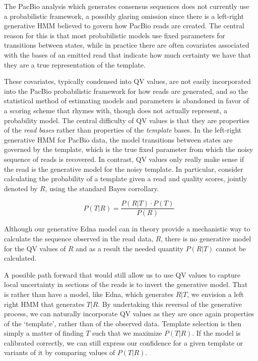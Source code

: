 \documentclass[fleqn,10pt]{SelfArx} %
\begin{document}
The PacBio analysis which generates consensus sequences does not currently use a probabilistic framework, a possibly glaring omission since there is a left-right generative HMM believed to govern how PacBio reads are created.  The central reason for this is that most probabilistic models use fixed parameters for transitions between states, while in practice there are often covariates associated with the bases of an emitted read that indicate how much certainty we have that they are a true representation of the template.

These covariates, typically condensed into QV values, are not easily incorporated into the PacBio probabilistic framework for how reads are generated, and so the statistical method of estimating models and parameters is abandoned in favor of a scoring scheme that rhymes with, though does not actually represent, a probability model.  The central difficulty of QV values is that they are properties of the \textit{read bases} rather than properties of the \textit{template} bases.  In the left-right generative HMM for PacBio data, the model transitions between states are governed by the template, which is the true fixed parameter from which the noisy sequence of reads is recovered.  In contrast, QV values only really make sense if the read is the generative model for the noisy template.  In particular, consider calculating the probability of a template given a read and quality scores, jointly denoted by $R$, using the standard Bayes corrollary.

\begin{dmath}
P(T|R) = \frac{P(R|T) \cdot P(T)}{P(R)}
\end{dmath}

Although our generative Edna model can in theory provide a mechanistic way to calculate the sequence observed in the read data, $R$, there is no generative model for the QV values of $R$ and as a result the needed quantity $P(R|T)$ cannot be calculated.

A possible path forward that would still allow us to use QV values to capture local uncertainty in sections of the reads is to invert the generative model.  That is rather than have a model, like Edna, which generates $R|T$, we envision a left right HMM that generates $T|R$.  By undertaking this reversal of the generative process, we can naturally incorporate QV values as they are once again properties of the `template', rather than of the observed data.  Template selection is then simply a matter of finding $T$ such that we maximize $P(T|R)$.  If the model is calibrated correctly, we can still express our confidence for a given template or variants of it by comparing values of $P(T|R)$.
\end{document}
